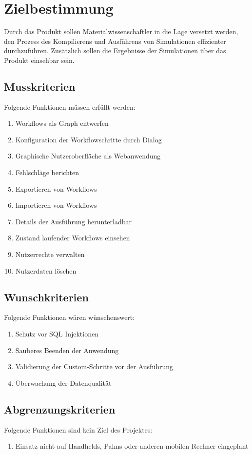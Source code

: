 \chapter{Zielbestimmung}
Durch das Produkt sollen Materialwissenschaftler in die Lage versetzt werden, den Prozess des Kompilierens und Ausführens von Simulationen effizienter durchzuführen. 
Zusätzlich sollen die Ergebnisse der Simulationen über das Produkt einsehbar sein. \newline
\section{Musskriterien}
Folgende Funktionen müssen erfüllt werden:
\renewcommand{\labelenumi}{/M\arabic{enumi}0/}
\begin{enumerate}
    \setlength\itemsep{-1em}
    \item Workflows als Graph entwerfen
    \item Konfiguration der Workflowschritte durch Dialog
    \item Graphische Nutzeroberfläche als Webanwendung
    \item Fehlschläge berichten
    \item Exportieren von Workflows
    \item Importieren von Workflows
    \item Details der Ausführung herunterladbar
    \item Zustand laufender Workflows einsehen
    \item Nutzerrechte verwalten
    \item Nutzerdaten löschen
\end{enumerate}
\newpage
\section{Wunschkriterien}
Folgende Funktionen wären wünschenswert:
\renewcommand{\labelenumi}{/W\arabic{enumi}0/}
\begin{enumerate}
    \setlength\itemsep{-1em}
    \item Schutz vor SQL Injektionen
    \item Sauberes Beenden der Anwendung
    \item Validierung der Custom-Schritte vor der Ausführung
    \item Überwachung der Datenqualität
\end{enumerate}

\section{Abgrenzungskriterien}
Folgende Funktionen sind kein Ziel des Projektes:
\renewcommand{\labelenumi}{/A\arabic{enumi}0/}
\begin{enumerate}
    \setlength\itemsep{-1em}
    \item Einsatz nicht auf Handhelds, Palms oder anderen mobilen Rechner eingeplant 
\end{enumerate}
\renewcommand{\labelenumi}{\arabic{enumi}}